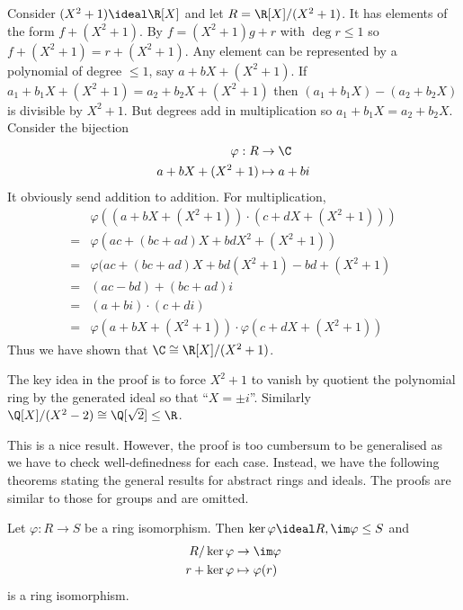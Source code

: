 \documentclass[a4paper]{article}
\theoremstyle{definition}
\begin{document}
\begin{eg}
  Consider \((X^2 + 1) \ideal \R[X]\) and let \(R = \R[X]/(X^2 + 1)\). It has elements of the form \(f + (X^2 + 1)\). By  \(f = (X^2 + 1)g + r\) with \(\deg r \leq 1\) so \(f + (X^2 + 1) = r + (X^2 + 1)\). Any element can be represented by a polynomial of degree \(\leq 1\), say \(a + bX + (X^2 + 1)\). If \(a_1 + b_1X + (X^2 + 1) = a_2 + b_2X + (X^2 + 1)\) then \((a_1 + b_1X) - (a_2 + b_2X)\) is divisible by \(X^2 + 1\). But degrees add in multiplication so \(a_1 + b_1X = a_2 + b_2X\). Consider the bijection
  \begin{align*}
    \varphi: R &\to \C \\
    a + bX + (X^2 + 1) &\mapsto a + bi
  \end{align*}
  It obviously send addition to addition. For multiplication,
  \begin{align*}
    &\varphi((a + bX + (X^2 + 1)) \cdot (c + dX + (X^2 + 1))) \\
    =& \varphi(ac + (bc + ad)X + bdX^2 + (X^2 + 1)) \\
    =& \varphi(ac + (bc + ad)X + bd(X^2 + 1) - bd + (X^2 + 1) \\
    =& (ac - bd) + (bc + ad)i \\
    =& (a + bi) \cdot (c + di) \\
    =& \varphi(a + bX + (X^2 + 1)) \cdot \varphi(c + dX + (X^2 + 1))
  \end{align*}
  Thus we have shown that \(\C \cong \R[X]/(X^2 + 1)\).
\end{eg}

\begin{remark}
  The key idea in the proof is to force \(X^2 + 1\) to vanish by quotient the polynomial ring by the generated ideal so that ``\(X = \pm i\)''. Similarly \(\Q[X]/(X^2 - 2) \cong \Q[\sqrt 2] \leq \R\).
\end{remark}

This is a nice result. However, the proof is too cumbersum to be generalised as we have to check well-definedness for each case. Instead, we have the following theorems stating the general results for abstract rings and ideals. The proofs are similar to those for groups and are omitted.

\begin{theorem}
  Let \(\varphi: R \to S\) be a ring isomorphism. Then \(\ker \varphi \ideal R, \im \varphi \leq S\) and
  \begin{align*}
    R/\ker \varphi &\to \im \varphi \\
    r + \ker \varphi &\mapsto \varphi(r)
  \end{align*}
  is a ring isomorphism.
\end{theorem}
\end{document}
